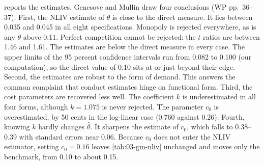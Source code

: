  reports the estimates. Genesove and Mullin draw four conclusions (WP pp.~36--37).
First, the NLIV estimate of $\theta$ is close to the direct measure. It lies between 0.035 and 0.045 in all
eight specifications. Monopoly is rejected everywhere, as is any $\theta$ above 0.11. Perfect competition
cannot be rejected: the $t$ ratios are between 1.46 and 1.61. The estimates are below the direct measure in
every case. The upper limits of the 95 percent confidence intervals run from 0.082 to 0.100 (our computation),
so the direct value of 0.10 sits at or just beyond their edge. Second, the estimates are robust to the form
of demand. This answers the common complaint that conduct estimates hinge on functional form. Third, the cost
parameters are recovered less well. The coefficient $k$ is underestimated in all four forms, although
$k = 1.075$ is never rejected. The parameter $c_0$ is overestimated, by 50 cents in the log-linear case (0.760
against 0.26). Fourth, knowing $k$ hardly changes $\hat\theta$. It sharpens the estimate of $c_0$, which falls to
0.38--0.39 with standard errors near 0.06. Because $c_0$ does not enter the NLIV estimator, setting $c_0 =
0.16$ leaves \cref{tab:03-gm-nliv} unchanged and moves only the benchmark, from 0.10 to about 0.15.

